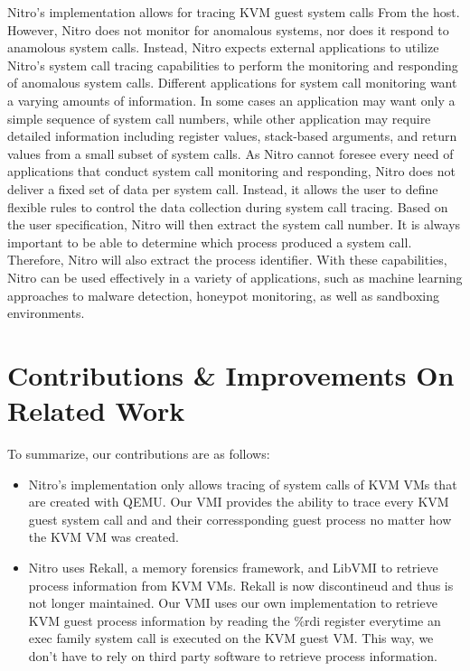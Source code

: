 \documentclass{report}
\begin{document}
\begin{spacing}{1.5}
{\large
Nitro's implementation allows for tracing KVM guest system calls From the host. However, Nitro does not monitor for anomalous systems, nor does it respond to anamolous system calls. Instead, Nitro expects external applications to utilize Nitro's system call tracing capabilities to perform the monitoring and responding of anomalous system calls. Different applications for system call monitoring want a varying amounts of information. In some cases an application may want only a simple sequence of system call numbers, while other application may require detailed information including register values, stack-based arguments, and return values from a small subset of system calls. As Nitro cannot foresee every need of applications that conduct system call monitoring and responding, Nitro does not deliver a fixed set of data per system call. Instead, it allows the user to define flexible rules to control the data collection during system call tracing. Based on the user specification, Nitro will then extract the system call number. It is always important to be able to determine which process produced a system call. Therefore, Nitro will also extract the process identifier. With these capabilities, Nitro can be used effectively in a variety of applications, such as machine learning approaches to malware detection, honeypot monitoring, as well as sandboxing environments.
\newline
}














\section{Contributions \& Improvements On Related Work}

{\large
To summarize, our contributions are as follows:

\begin{itemize}
  \item Nitro's implementation only allows tracing of system calls of KVM VMs that are created with QEMU. Our VMI provides the ability to trace every KVM guest system call and and their corressponding guest process no matter how the KVM VM was created.

  \item Nitro uses Rekall, a memory forensics framework, and LibVMI to retrieve process information from KVM VMs. Rekall is now discontineud and thus is not longer maintained. Our VMI uses our own implementation to retrieve KVM guest process information by reading the \%rdi register everytime an exec family system call is executed on the KVM guest VM. This way, we don't have to rely on third party software to retrieve process information.
  

\end{itemize}}
\end{spacing}
\end{document}
